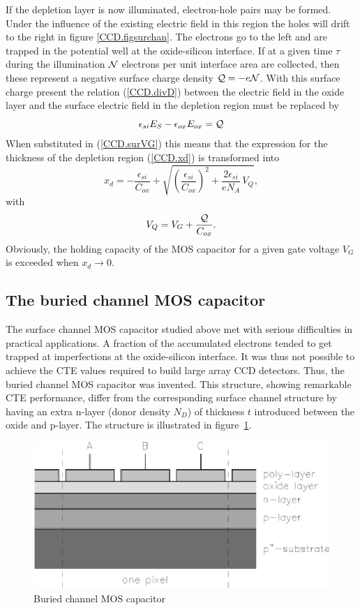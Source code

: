 \documentclass{article}
\def\cl#1{{\cal #1}}               %
\begin{document}
If the depletion layer is now illuminated, electron-hole pairs may be
formed. Under the influence of the existing electric field in this
region the holes will drift to the right in figure
\ref{CCD.figsurchan}. The electrons go to the left and are trapped in
the potential well at the oxide-silicon interface. If at a given time
$\tau$ during the illumination $\cl N$ electrons per unit interface
area are collected, then these represent a negative surface charge
density $\cl Q = -e\cl N$. With this surface charge present the
relation (\ref{CCD.divD}) between the electric field in the oxide layer
and the surface electric field in the depletion region must be
replaced by
\begin{equation}
  \epsilon_{si} E_S - \epsilon_{ox} E_{ox} = \cl Q
\end{equation}
When substituted in (\ref{CCD.surVG}) this means that the expression
for the thickness of the depletion region (\ref{CCD.xd}) is
transformed into
\begin{equation}
  x_d = -\frac{\epsilon_{si}}{C_{ox}} +
  \sqrt{\left(\frac{\epsilon_{si}}{C_{ox}}\right)^2+\frac{2\epsilon_{si}}{eN_A} \, V_Q},
\end{equation}
with
\begin{equation}
  V_Q = V_G + \frac{\cl Q}{C_{ox}}.
\end{equation}
Obviously, the holding capacity of the MOS capacitor for a given gate
voltage $V_G$ is exceeded when $x_d \rightarrow 0$.

\subsection*{The buried channel MOS capacitor}

The surface channel MOS capacitor studied above met with serious
difficulties in practical applications. A fraction of the accumulated
electrons tended to get trapped at imperfections at the oxide-silicon
interface. It was thus not possible to achieve the CTE values required
to build large array CCD detectors. Thus, the buried channel MOS
capacitor was invented. This structure, showing remarkable CTE
performance, differ from the corresponding surface channel structure
by having an extra n-layer (donor density $N_D$) of thickness $t$
introduced between the oxide and p-layer. The structure is
illustrated in figure~\ref{CCD.fignMOS}.

\begin{figure}[h]
  \centering
	\includegraphics{CCD_nMOS.eps}
  \caption{Buried channel MOS capacitor}
  \label{CCD.fignMOS}
\end{figure}
\end{document}

